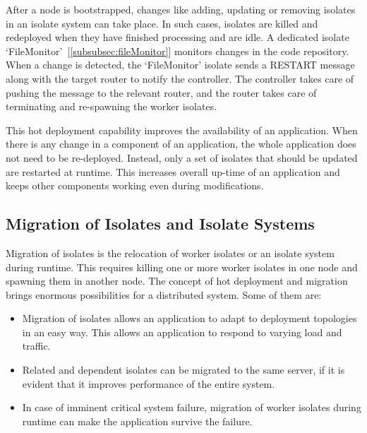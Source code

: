   After a node is bootstrapped, changes like adding, updating or removing isolates in an isolate system can take place. In such cases, isolates are killed and redeployed when they have finished processing and are idle. A dedicated isolate ‘FileMonitor’~[\autoref{subsubsec:fileMonitor}] monitors changes in the code repository. When a change is detected, the ‘FileMonitor’ isolate sends a RESTART message along with the target router to notify the controller. The controller takes care of pushing the message to the relevant router, and the router takes care of terminating and re-spawning the worker isolates.

  This hot deployment capability improves the availability of an application. When there is any change in a component of an application, the whole application does not need to be re-deployed. Instead, only a set of isolates that should be updated are restarted at runtime. This increases overall up-time of an application and keeps other components working even during modifications.

\subsection{Migration of Isolates and Isolate Systems}
  Migration of isolates is the relocation of worker isolates or an isolate system during runtime. This requires killing one or more worker isolates in one node and spawning them in another node. The concept of hot deployment and migration brings enormous possibilities for a distributed system. Some of them are:

\begin{itemize}

  \item Migration of isolates allows an application to adapt to deployment topologies in an easy way. This allows an application to respond to varying load and traffic.

  \item Related and dependent isolates can be migrated to the same server, if it is evident that it improves performance of the entire system.

  \item In case of imminent critical system failure, migration of worker isolates during runtime can make the application survive the failure.

\end{itemize}

